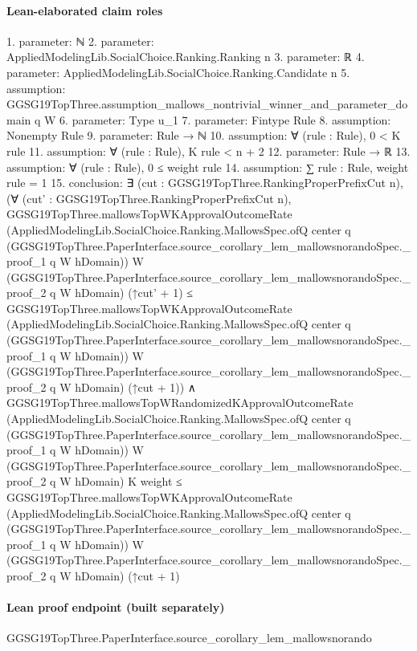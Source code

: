 \documentclass[10pt]{article}
\begin{document}
\paragraph{Lean-elaborated claim roles}\begin{ReviewVerbatim}
1. parameter: ℕ
2. parameter: AppliedModelingLib.SocialChoice.Ranking.Ranking n
3. parameter: ℝ
4. parameter: AppliedModelingLib.SocialChoice.Ranking.Candidate n
5. assumption: GGSG19TopThree.assumption_mallows_nontrivial_winner_and_parameter_domain q W
6. parameter: Type u_1
7. parameter: Fintype Rule
8. assumption: Nonempty Rule
9. parameter: Rule → ℕ
10. assumption: ∀ (rule : Rule), 0 < K rule
11. assumption: ∀ (rule : Rule), K rule < n + 2
12. parameter: Rule → ℝ
13. assumption: ∀ (rule : Rule), 0 ≤ weight rule
14. assumption: ∑ rule : Rule, weight rule = 1
15. conclusion: ∃ (cut : GGSG19TopThree.RankingProperPrefixCut n),
  (∀ (cut' : GGSG19TopThree.RankingProperPrefixCut n),
      GGSG19TopThree.mallowsTopWKApprovalOutcomeRate
          (AppliedModelingLib.SocialChoice.Ranking.MallowsSpec.ofQ center q
            (GGSG19TopThree.PaperInterface.source_corollary_lem_mallowsnorandoSpec._proof_1 q W hDomain))
          W (GGSG19TopThree.PaperInterface.source_corollary_lem_mallowsnorandoSpec._proof_2 q W hDomain) (↑cut' + 1) ≤
        GGSG19TopThree.mallowsTopWKApprovalOutcomeRate
          (AppliedModelingLib.SocialChoice.Ranking.MallowsSpec.ofQ center q
            (GGSG19TopThree.PaperInterface.source_corollary_lem_mallowsnorandoSpec._proof_1 q W hDomain))
          W (GGSG19TopThree.PaperInterface.source_corollary_lem_mallowsnorandoSpec._proof_2 q W hDomain) (↑cut + 1)) ∧
    GGSG19TopThree.mallowsTopWRandomizedKApprovalOutcomeRate
        (AppliedModelingLib.SocialChoice.Ranking.MallowsSpec.ofQ center q
          (GGSG19TopThree.PaperInterface.source_corollary_lem_mallowsnorandoSpec._proof_1 q W hDomain))
        W (GGSG19TopThree.PaperInterface.source_corollary_lem_mallowsnorandoSpec._proof_2 q W hDomain) K weight ≤
      GGSG19TopThree.mallowsTopWKApprovalOutcomeRate
        (AppliedModelingLib.SocialChoice.Ranking.MallowsSpec.ofQ center q
          (GGSG19TopThree.PaperInterface.source_corollary_lem_mallowsnorandoSpec._proof_1 q W hDomain))
        W (GGSG19TopThree.PaperInterface.source_corollary_lem_mallowsnorandoSpec._proof_2 q W hDomain) (↑cut + 1)
\end{ReviewVerbatim}

\paragraph{Lean proof endpoint (built separately)}\begin{ReviewVerbatim}
GGSG19TopThree.PaperInterface.source_corollary_lem_mallowsnorando
\end{ReviewVerbatim}
\end{document}
